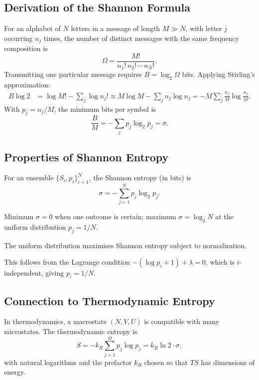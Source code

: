 \subsection{Derivation of the Shannon Formula}

For an alphabet of $N$ letters in a message of length $M\gg N$, with letter $j$ occurring $n_j$ times, the number of distinct messages with the same frequency composition is
\begin{equation}
    \Omega = \frac{M!}{n_1!\, n_2!\, \cdots\, n_N!}.
\end{equation}
Transmitting one particular message requires $B = \log_2\Omega$ bits. Applying Stirling's approximation:
\begin{align}
    B \log 2 &= \log M! - \sum_j \log n_j!
    \approx M\log M - \sum_j n_j \log n_j
    = -M\sum_j \frac{n_j}{M}\log\frac{n_j}{M}.
\end{align}
With $p_j = n_j/M$, the minimum bits per symbol is
\begin{equation}
    \frac{B}{M} = -\sum_j p_j \log_2 p_j = \sigma.
\end{equation}

\subsection{Properties of Shannon Entropy}

\begin{definition}
For an ensemble $\{S_i, p_i\}_{i=1}^{N}$, the Shannon entropy (in bits) is
\begin{equation}
    \sigma = -\sum_{j=1}^{N} p_j \log_2 p_j.
\end{equation}
\end{definition}

Minimum $\sigma = 0$ when one outcome is certain; maximum $\sigma = \log_2 N$ at the uniform distribution $p_j = 1/N$.

\begin{fact}
The uniform distribution maximises Shannon entropy subject to normalization.
\end{fact}
This follows from the Lagrange condition $-(\log p_i + 1) + \lambda = 0$, which is $i$-independent, giving $p_i = 1/N$.

\subsection{Connection to Thermodynamic Entropy}

In thermodynamics, a macrostate $(N, V, U)$ is compatible with many microstates. The thermodynamic entropy is
\begin{equation}
    S = -k_B \sum_{j=1}^{\Omega} p_j \log p_j = k_B \ln 2\cdot \sigma,
\end{equation}
with natural logarithms and the prefactor $k_B$ chosen so that $TS$ has dimensions of energy.

